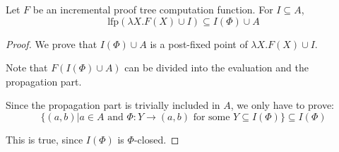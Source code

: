 \documentclass[12pt]{article}
\begin{document}
\begin{theorem}[Completeness]
	Let $F$ be an incremental proof tree computation function.
	For $I\subseteq A$,
	\[\text{lfp}(\lambda X.F(X)\cup I)\subseteq I(\Phi)\cup A\]
\end{theorem}
\begin{proof}
	We prove that $I(\Phi)\cup A$ is a post-fixed point of $\lambda X.F(X)\cup I$.

	Note that $F(I(\Phi)\cup A)$ can be divided into the evaluation and the propagation part.

	Since the propagation part is trivially included in $A$, we only have to prove:
	\[\{(a,b)|a\in A\text{ and }\Phi:Y\rightarrow(a,b)\text{ for some }Y\subseteq I(\Phi)\}\subseteq I(\Phi)\]

	This is true, since $I(\Phi)$ is $\Phi$-closed.
\end{proof}
\end{document}
